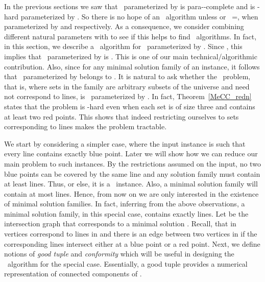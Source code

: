 









In the previous sections we saw that \slrbsc\ parameterized by  is para-\NP-complete and is  \W[1]-hard parameterized by 
.  So there is no hope of an \FPT\ algorithm unless  or \FPT\ =\W[1], when parameterized by  and  respectively.  As a consequence, we consider combining different natural parameters with  to see if this helps to find \FPT\ algorithms. In fact, in this section, we describe a \FPT\ algorithm for \slrbsc\ parameterized by .  Since , this implies that \slrbsc\ parameterized by  is \FPT. This is one of our main technical/algorithmic contribution. 
Also, since  for any minimal solution family of an instance, it follows that \slrbsc\ parameterized by  belongs to \FPT. It is natural to ask whether the \srbsc\ problem, that is, where sets in the family are arbitrary subsets  of the universe and need not correspond to lines, is \FPT\ parameterized by . In fact, Theorem~\ref{MeCC_redn} states that the problem is \W[1]-hard even when each set is of size three and contains at least two red points. This shows that indeed restricting ourselves to sets corresponding to lines makes the problem tractable. 











We start by considering a simpler case, where the input instance is such that every line contains exactly  blue point. Later we will show how we can reduce our main problem to such instances. By the restrictions assumed on the input, no two blue points can be covered by the same line and any solution family must contain at least  lines. Thus,  or else, it is a \NO\ instance. Also, a minimal solution family will contain at most  lines. Hence, from now on we are only interested in the existence of minimal solution families. In fact, inferring from the above observations, a minimal solution family, in this special case, contains exactly  lines. Let  be the intersection graph that corresponds to a minimal solution . Recall, that in  vertices correspond to lines in  and there is an edge between two vertices  in  if the corresponding lines intersect either at a blue point or a red point. Next, we define notions of 
{\em good tuple} and {\em conformity} which will be useful in designing the \FPT\ algorithm for the special case. 
Essentially, a good tuple provides a numerical representation of connected components of . 

